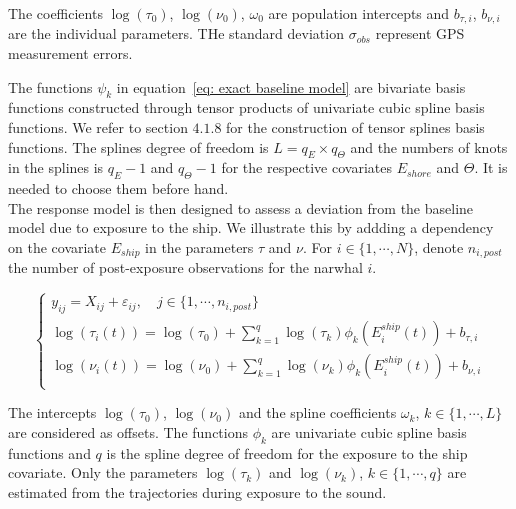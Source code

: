 \documentclass[11pt]{article}
\newcommand {\1}{\mathbb{1}}
\theoremstyle{definition}
\theoremstyle{remark}
\theoremstyle{remark}
\begin{document}
The coefficients $\log(\tau_{0})$, $\log(\nu_{0})$, $\omega_{0}$ are population intercepts and $b_{\tau,i}$, $b_{\nu,i}$
are the individual parameters. THe standard deviation $\sigma_{obs}$ represent GPS measurement errors.

The functions $\psi_k$ in equation~\eqref{eq: exact baseline model} are bivariate basis functions constructed through tensor products of univariate cubic spline basis functions. We refer to \cite{wood_generalized_2017} section $4.
1.8$ for the construction of tensor splines basis functions. The splines degree of freedom is $L=q_E \times q_{\Theta}$ and the numbers of knots in the splines is $q_E-1$ and $q_{\Theta}-1$ for the respective covariates $E_{shore}$ and $\Theta$. It is needed to choose them before hand.\\

The response model is then designed to assess a deviation from the baseline model due to exposure to the ship. We illustrate this by addding a dependency on the covariate $E_{ship}$ in the parameters $\tau$ and $\nu$. 
For $i \in \{1, \cdots, N\}$, denote $n_{i,post}$ the number of post-exposure observations for the narwhal $i$.

\begin{equation}   \left\{
	\begin{array}{l}
		y_{ij}=X_{ij}+\varepsilon_{ij}, \quad j \in \{1,\cdots,n_{i,post}\} \\
		\log(\tau_{i}(t))=\log(\tau_{0}) +\sum_{k=1}^{q} \log(\tau_{k})\phi_{k}(E^{ship}_i(t))+b_{\tau,i} \\
		\log(\nu_{i}(t))=\log(\nu_{0}) +  \sum_{k=1}^{q} \log(\nu_{k}) \phi_{k}(E^{ship}_i(t)) +b_{\nu,i}  \\
	\end{array}
	\right.
	\label{eq: exact response model}
\end{equation}

The intercepts $\log(\tau_0)$, $\log(\nu_0)$ and the spline coefficients $\omega_k$, $k \in \{1,\cdots,L\}$ are considered as offsets.
The functions $\phi_k$ are univariate cubic spline basis functions and $q$ is the spline degree of freedom for the exposure to the ship covariate. Only the parameters $\log(\tau_k)$ and $\log(\nu_k)$, $k \in \{1,\cdots,q\}$ are estimated from the trajectories during exposure to the sound.
\end{document}
